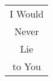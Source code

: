 \documentclass{standalone}
\begin{document}
\huge
{} %

\begin{tabular}{c}
  I Would \\
  Never \\
  Lie \\
  to You \\
\end{tabular}
\end{document}
